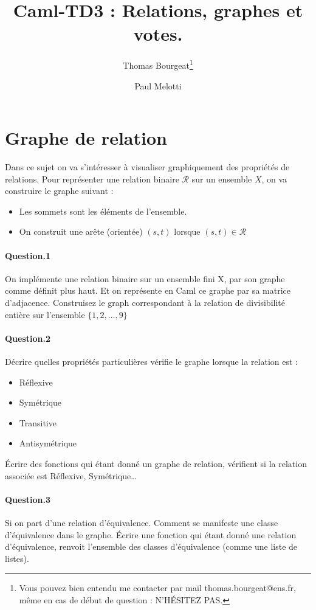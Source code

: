 \documentclass[10pt,a4paper]{article}
\begin{document}
\title{Caml-TD3 : Relations, graphes et votes.}
\author{Thomas Bourgeat\footnote{Vous pouvez bien entendu me contacter par mail thomas.bourgeat@ens.fr, même en cas de début de question : N'HÉSITEZ PAS.}\and Paul Melotti}
\maketitle{}

\section{Graphe de relation}

Dans ce sujet on va s'intéresser à visualiser graphiquement des
propriétés de relations. Pour représenter une relation binaire $\mathcal{R}$ sur un ensemble
$X$, on va construire le graphe suivant : 
\begin{itemize}
\item Les sommets sont les éléments de l'ensemble.
\item On construit une arête (orientée) $(s,t)$ lorsque $(s,t)\in
\mathcal{R}$
\end{itemize}
\paragraph{Question.1\\}
On implémente une relation binaire sur un ensemble fini X, par son graphe
comme définit plus haut. Et on représente en Caml ce graphe par sa
matrice d'adjacence. Construisez le graph correspondant à la relation de
divisibilité entière sur l'ensemble $\{1,2,\dots,9\}$

\paragraph{Question.2\\}
Décrire quelles propriétés particulières vérifie le graphe lorsque la
relation est :
\begin{itemize}
\item Réflexive
\item Symétrique
\item Transitive
\item Antisymétrique
\end{itemize}  
Écrire des fonctions qui étant donné un graphe de relation, vérifient si
la relation associée est Réflexive, Symétrique\dots

\paragraph{Question.3\\}
Si on part d'une relation d'équivalence. Comment se manifeste une classe
d'équivalence dans le graphe. Écrire une fonction qui étant donné une
relation d'équivalence, renvoit l'ensemble des classes d'équivalence
(comme une liste de listes).
\end{document}
